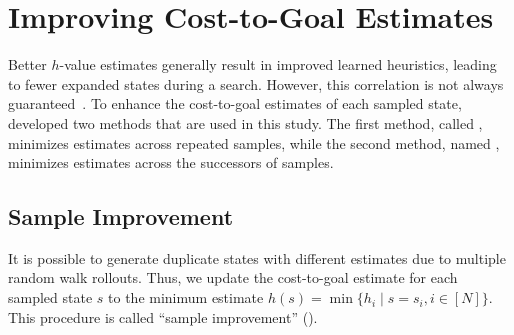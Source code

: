 \documentclass[ppgc,diss,english]{iiufrgs}
\newtheorem{property}{Property}
\begin{document}
\section{Improving Cost-to-Goal Estimates}
\label{sec:sample-improving-h}



Better $h$-value estimates generally result in improved learned heuristics, leading to fewer expanded states during a search. However, this correlation is not always guaranteed~\cite{Holte/2010}. To enhance the cost-to-goal estimates of each sampled state,~\citet{Bettker.etal/2022} developed two methods that are used in this study. The first method, called \sai, minimizes estimates across repeated samples, while the second method, named \sui, minimizes estimates across the successors of samples.


\subsection{Sample Improvement}
\label{sec:sample-sai}
It is possible to generate duplicate states with different estimates due to multiple random walk rollouts. Thus, we update the cost-to-goal estimate for each sampled state $s$ to the minimum estimate $h(s) = \min\{h_i \mid s=s_i, i\in[N]\}$.
This procedure is called ``sample improvement'' (\sai).
\end{document}
